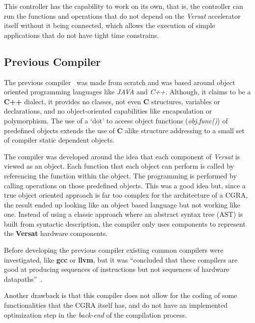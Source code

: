 This controller has the capability to work on its own, that is, the controller
can run the functions and operations that do not depend on the {\it Versat}
accelerator itself without it being connected, which allows the execution of
simple applications that do not have tight time constrains.

\subsection{Previous Compiler}

The previous compiler~\cite{Santiago2017} was made from scratch and
was based around object oriented programming languages like {\it JAVA}
and {\it C++}.  Although, it claims to be
a {\bf C++} dialect, it provides no classes, not even {\bf C} structures,
variables or declarations, and no object-oriented capabilities like
encapsulation or polymorphism.  The use of a `dot' to access object functions
({\em obj.func()}) of predefined objects extends the use of {\bf C} alike
structure addressing to a small set of compiler static dependent objects.

The compiler was developed around the idea that each component of {\it Versat}
is viewed as an object. Each function that each object can perform is called by
referencing the function within the object.  The programming is performed by
calling operations on those predefined objects.  This was a good idea but, since
a true object oriented approach is far too complex for the architecture of a
{\sc CGRA}, the result ended up looking like an object based language but not
working like one.  Instead of using a classic approach where an abstract syntax tree ({\sc AST}) is
built from syntactic description, the compiler only uses components to represent
the {\bf Versat} hardware components.


Before developing the previous compiler existing common compilers were
investigated, like {\bf gcc} or {\bf llvm}, but it was ``concluded that
these compilers are good at producing sequences of instructions but not
sequences of hardware datapaths''~\cite[p.~21]{Lopes2017}.


Another drawback is that this compiler does not allow for the coding of some
functionalities that the {\sc CGRA} itself has, and do not have an implemented
optimization step in the {\it back-end} of the compilation process.


